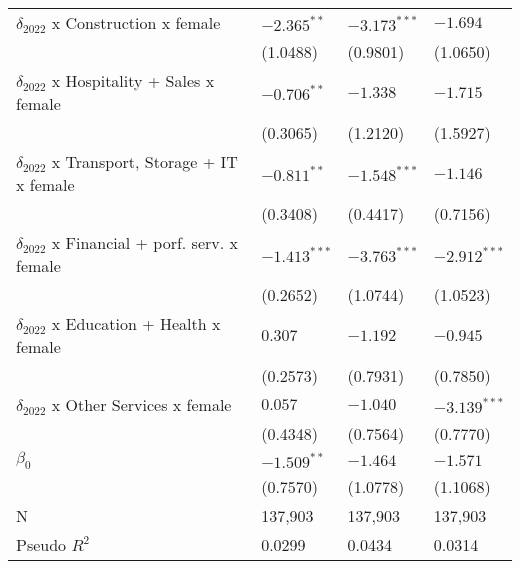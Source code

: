 \begin{tabular}{llll}
$\delta_{2022}$ x Construction x female            &      $-2.365^{**}$ &     $-3.173^{***}$ &           $-1.694$ \\
                                                   &           (1.0488) &           (0.9801) &           (1.0650) \\
$\delta_{2022}$ x Hospitality + Sales x female     &      $-0.706^{**}$ &           $-1.338$ &           $-1.715$ \\
                                                   &           (0.3065) &           (1.2120) &           (1.5927) \\
$\delta_{2022}$ x Transport, Storage + IT x female &      $-0.811^{**}$ &     $-1.548^{***}$ &           $-1.146$ \\
                                                   &           (0.3408) &           (0.4417) &           (0.7156) \\
$\delta_{2022}$ x Financial + porf. serv. x female &     $-1.413^{***}$ &     $-3.763^{***}$ &     $-2.912^{***}$ \\
                                                   &           (0.2652) &           (1.0744) &           (1.0523) \\
$\delta_{2022}$ x Education + Health x female      &            $0.307$ &           $-1.192$ &           $-0.945$ \\
                                                   &           (0.2573) &           (0.7931) &           (0.7850) \\
$\delta_{2022}$ x Other Services x female          &            $0.057$ &           $-1.040$ &     $-3.139^{***}$ \\
                                                   &           (0.4348) &           (0.7564) &           (0.7770) \\
$\beta_0$                                          &      $-1.509^{**}$ &           $-1.464$ &           $-1.571$ \\
                                                   &           (0.7570) &           (1.0778) &           (1.1068) \\
N                                                  &            137,903 &            137,903 &            137,903 \\
Pseudo $R^2$                                       &             0.0299 &             0.0434 &             0.0314 \\
\bottomrule
\end{tabular}

